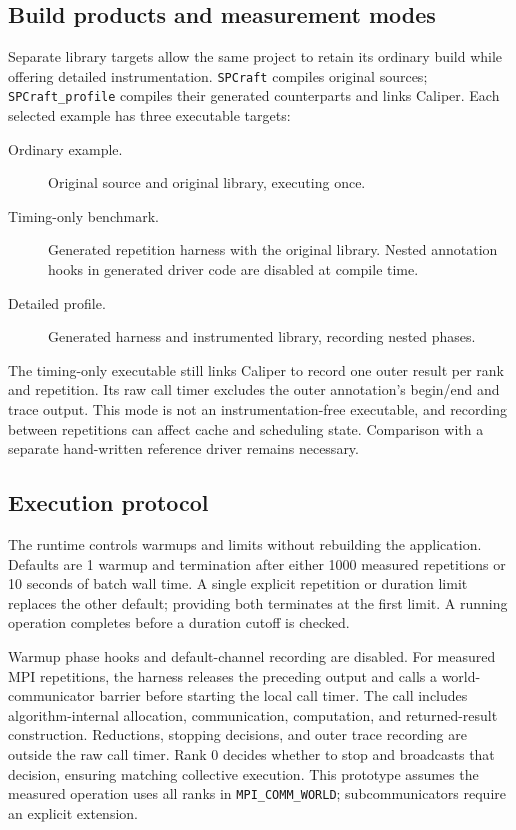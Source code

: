 \documentclass[10pt]{article}
\begin{document}
\subsection{Build products and measurement modes}
Separate library targets allow the same project to retain its ordinary build while
offering detailed instrumentation. \texttt{SPCraft} compiles original sources;
\texttt{SPCraft\_profile} compiles their generated counterparts and links Caliper.
Each selected example has three executable targets:
\begin{description}
\item[Ordinary example.] Original source and original library, executing once.
\item[Timing-only benchmark.] Generated repetition harness with the original library.
Nested annotation hooks in generated driver code are disabled at compile time.
\item[Detailed profile.] Generated harness and instrumented library, recording nested phases.
\end{description}
The timing-only executable still links Caliper to record one outer result per rank
and repetition. Its raw call timer excludes the outer annotation's begin/end and
trace output. This mode is not an instrumentation-free executable, and recording
between repetitions can affect cache and scheduling state. Comparison with a separate
hand-written reference driver remains necessary.

\subsection{Execution protocol}
The runtime controls warmups and limits without rebuilding the application.
Defaults are 1 warmup and termination after either 1000 measured repetitions or
10 seconds of batch wall time. A single explicit repetition or duration limit
replaces the other default; providing both terminates at the first limit. A running
operation completes before a duration cutoff is checked.

Warmup phase hooks and default-channel recording are disabled. For measured MPI
repetitions, the harness releases the preceding output and calls a world-communicator
barrier before starting the local call timer. The call includes algorithm-internal
allocation, communication, computation, and returned-result construction. Reductions,
stopping decisions, and outer trace recording are outside the raw call timer. Rank 0
decides whether to stop and broadcasts that decision, ensuring matching collective
execution. This prototype assumes the measured operation uses all ranks in
\texttt{MPI\_COMM\_WORLD}; subcommunicators require an explicit extension.
\end{document}
